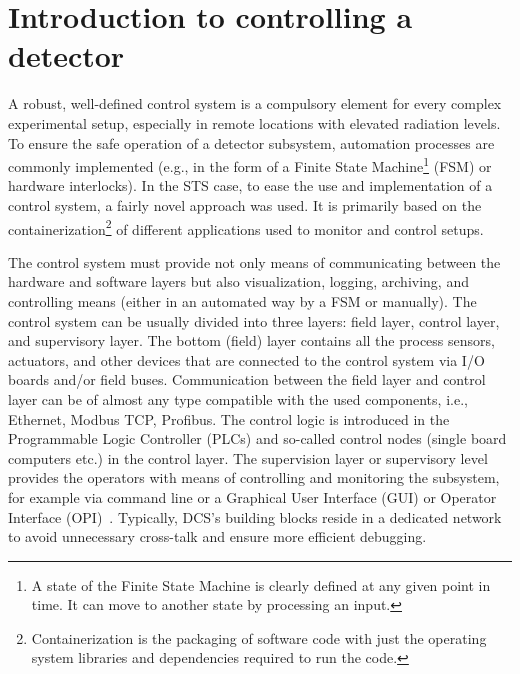 \section{Introduction to controlling a detector}
A robust, well-defined control system is a compulsory element for every complex experimental setup, especially in remote locations with elevated radiation levels. To ensure the safe operation of a detector subsystem, automation processes are commonly implemented (e.g., in the form of a Finite State Machine\footnote{A state of the Finite State Machine is clearly defined at any given point in time. It can move to another state by processing an input.} (\gls{FSM}) or hardware interlocks). In the \gls{STS} case, to ease the use and implementation of a control system, a fairly novel approach was used. It is primarily based on the containerization\footnote{Containerization is the packaging of software code with just the operating system libraries and dependencies required to run the code.} of different applications used to monitor and control setups. 




The control system must provide not only means of communicating between the hardware and software layers but also visualization, logging, archiving, and controlling means (either in an automated way by a \gls{FSM} or manually). The control system can be usually divided into three layers: field layer, control layer, and supervisory layer. The bottom (field) layer contains all the process sensors, actuators, and other devices that are connected to the control system via I/O boards and/or field buses. Communication between the field layer and control layer can be of almost any type compatible with the used components, i.e., Ethernet, Modbus \gls{TCP}, Profibus. The control logic is introduced in the Programmable Logic Controller (\glspl{PLC}) and so-called control nodes (single board computers etc.) in the control layer. The supervision layer or supervisory level provides the operators with means of controlling and monitoring the subsystem, for example via command line or a Graphical User Interface (\gls{GUI}) or Operator Interface (\gls{OPI})~\cite{layers}.  Typically, DCS's building blocks reside in a dedicated network to avoid unnecessary cross-talk and ensure more efficient debugging.

